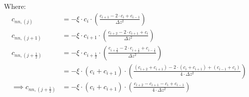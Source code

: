 \documentclass{article}
\begin{document}
Where:
\begin{align*}
  c_{nn, (j)} &=  -\xi\cdot c_i\cdot\left(\frac{c_{i+1}-2\cdot c_i + c_{i-1}}{\Delta z^2}\right)\\
  c_{nn, (j+1)} &=  -\xi\cdot c_{i+1}\cdot\left(\frac{c_{i+2}-2\cdot c_{i+1} + c_{i}}{\Delta z^2}\right)\\
  c_{nn, (j+\frac{1}{2})} &=  -\xi\cdot c_{i+\frac{1}{2}}\cdot\left(\frac{c_{i+\frac{3}{2}}-2\cdot c_{i+\frac{1}{2}} + c_{i-\frac{1}{2}}}{\Delta z^2}\right)\\
                          &=  -\xi\cdot (c_i + c_{i+1})\cdot\left(\frac{(c_{i+2} + c_{i+1})-2\cdot (c_{i} + c_{i+1}) + (c_{i-1} + c_{i})}{4\cdot\Delta z^2}\right)\\
  \implies c_{nn, (j+\frac{1}{2})} &= -\xi\cdot (c_{i} + c_{i+1})\cdot\left(\frac{c_{i+2} - c_{i+1}-c_{i} + c_{i-1}}{4\cdot\Delta z^2}\right)\\
\end{align*}
\end{document}
